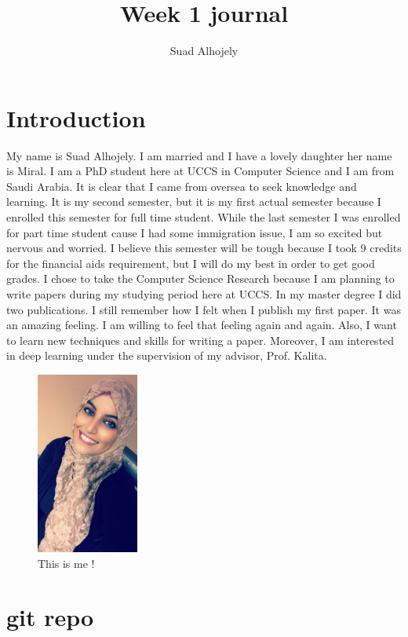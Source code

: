 \documentclass[a4paper]{article}
\title{Week 1 journal}
\author{Suad Alhojely}
\begin{document}
\maketitle

\section{Introduction}
My name is Suad Alhojely. I am married and I have a lovely daughter her name is Miral. I am a PhD student here at UCCS in Computer Science and I am from Saudi Arabia. It is clear that I came from oversea to seek knowledge and learning. It is my second semester, but it is my first actual semester because I enrolled this semester for full time student. While the last semester I was enrolled for part time student cause I had some immigration issue, I am so excited but nervous and worried. I believe this semester will be tough because I took 9 credits for the financial aids requirement, but I will do my best in order to get good grades. I chose to take the Computer Science Research because I am planning to write papers during my studying period here at UCCS. In my master degree I did two publications. I still remember how I felt when I publish my first paper. It was an amazing feeling. I am willing to feel that feeling again and again. Also, I want to learn new techniques and skills for writing a paper. Moreover, I am interested in deep learning under the supervision of my advisor, Prof. Kalita. 




\begin{figure}
\centering
\includegraphics[width=0.3\textwidth]{sosa.jpg}
\caption{\label{fig:sosa} This is  me !}
\end{figure}


\section{git repo}
\end{document}
